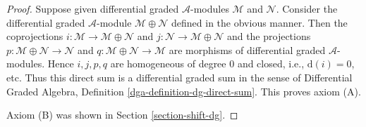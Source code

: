 \documentclass[10pt,a4paper]{amsart}
\theoremstyle{plain}
\theoremstyle{definition}
\theoremstyle{remark}
\numberwithin{equation}{subsection}
\begin{document}
\begin{proof}
Suppose given differential graded $\mathcal{A}$-modules
$\mathcal{M}$ and $\mathcal{N}$. Consider the
differential graded $\mathcal{A}$-module $\mathcal{M} \oplus \mathcal{N}$
defined in the obvious manner. Then the coprojections
$i : \mathcal{M} \to \mathcal{M} \oplus \mathcal{N}$ and
$j : \mathcal{N} \to \mathcal{M} \oplus \mathcal{N}$ and the
projections
$p : \mathcal{M} \oplus \mathcal{N} \to \mathcal{N}$ and
$q : \mathcal{M} \oplus \mathcal{N} \to \mathcal{M}$
are morphisms of differential graded $\mathcal{A}$-modules.
Hence $i, j, p, q$ are homogeneous
of degree $0$ and closed, i.e., $\text{d}(i) = 0$, etc.
Thus this direct sum is a differential graded sum in the sense of
Differential Graded Algebra, Definition \ref{dga-definition-dg-direct-sum}.
This proves axiom (A).

\medskip\noindent
Axiom (B) was shown in Section \ref{section-shift-dg}.
\end{proof}
\end{document}
